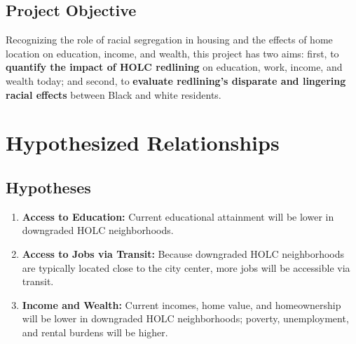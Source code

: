\documentclass[paper=letter, fontsize=12pt]{scrartcl} %
\begin{document}
	\subsection{Project Objective}
	Recognizing the role of racial segregation in housing and the effects of home location on education, income, and wealth, this project has two aims: first, to \textbf{quantify the impact of HOLC redlining} on education, work, income, and wealth today; and second, to \textbf{evaluate redlining's disparate and lingering racial effects} between Black and white residents.\par
	
	\section{Hypothesized Relationships}
	\subsection{Hypotheses}
	\begin{enumerate}
		\item \textbf{Access to Education:} Current educational attainment will be lower in downgraded HOLC neighborhoods.
		\item \textbf{Access to Jobs via Transit:} Because downgraded HOLC neighborhoods are typically located close to the city center, more jobs will be accessible via transit.
		\item \textbf{Income and Wealth:} Current incomes, home value, and homeownership will be lower in downgraded HOLC neighborhoods; poverty, unemployment, and rental burdens will be higher.
	\end{enumerate}
\end{document}
